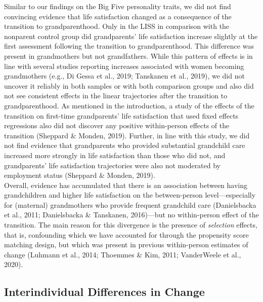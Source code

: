 \documentclass[
  english,
  man, noextraspace,floatsintext]{apa7}
\begin{document}
Similar to our findings on the Big Five personality traits, we did not find convincing evidence that life satisfaction changed as a consequence of the transition to grandparenthood. Only in the LISS in comparison with the nonparent control group did grandparents' life satisfaction increase slightly at the first assessment following the transition to grandparenthood. This difference was present in grandmothers but not grandfathers. While this pattern of effects is in line with several studies reporting increases associated with women becoming grandmothers (e.g., Di Gessa et al., 2019; Tanskanen et al., 2019), we did not uncover it reliably in both samples or with both comparison groups and also did not see consistent effects in the linear trajectories after the transition to grandparenthood. As mentioned in the introduction, a study of the effects of the transition on first-time grandparents' life satisfaction that used fixed effects regressions also did not discover any positive within-person effects of the transition (Sheppard \& Monden, 2019). Further, in line with this study, we did not find evidence that grandparents who provided substantial grandchild care increased more strongly in life satisfaction than those who did not, and grandparents' life satisfaction trajectories were also not moderated by employment status (Sheppard \& Monden, 2019).\\
Overall, evidence has accumulated that there is an association between having grandchildren and higher life satisfaction on the between-person level---especially for (maternal) grandmothers who provide frequent grandchild care (Danielsbacka et al., 2011; Danielsbacka \& Tanskanen, 2016)---but no within-person effect of the transition. The main reason for this divergence is the presence of \emph{selection} effects, that is, confounding which we have accounted for through the propensity score matching design, but which was present in previous within-person estimates of change (Luhmann et al., 2014; Thoemmes \& Kim, 2011; VanderWeele et al., 2020).

\hypertarget{interindividual-differences-in-change-1}{%
\subsection{Interindividual Differences in Change}\label{interindividual-differences-in-change-1}}
\end{document}

